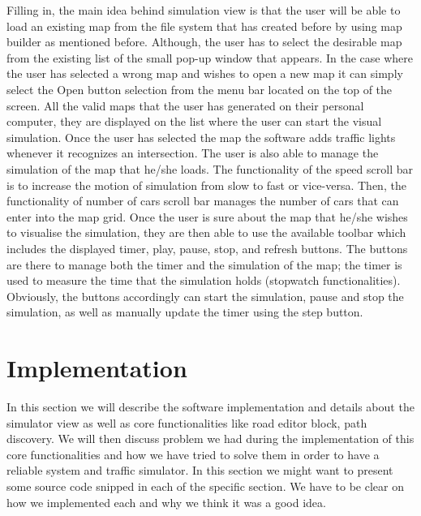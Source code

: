 \documentclass[oneside]{article}
\begin{document}
\noindent Filling in, the main idea behind simulation view is that the user will be able to load an existing map from the file system that has created before by using map builder as mentioned before. Although, the user has to select the desirable map from the existing list of the small pop-up window that appears. In the case where the user has selected a wrong map and wishes to open a new map it can simply select the Open button selection from the menu bar located on the top of the screen. All the valid maps that the user has generated on their personal computer, they are displayed on the list where the user can start the visual simulation. Once the user has selected the map the software adds traffic lights whenever it recognizes an intersection. The user is also able to manage the simulation of the map that he/she loads. The functionality of the speed scroll bar is to increase the motion of simulation from slow to fast or vice-versa. Then, the functionality of number of cars scroll bar manages the number of cars that can enter into the map grid. Once the user is sure about the map that he/she wishes to visualise the simulation, they are then able to use the available toolbar which includes the displayed timer, play, pause, stop, and refresh buttons. The buttons are there to manage both the timer and the simulation of the map; the timer is used to measure the time that the simulation holds (stopwatch functionalities). Obviously, the buttons accordingly can start the simulation, pause and stop the simulation, as well as manually update the timer using the step button.
\newpage

\section{Implementation}

\noindent In this section we will describe the software implementation and details about the simulator view as well as core functionalities like road editor block, path discovery. We will then discuss problem we had during the implementation of this core functionalities and how we have tried to solve them in order to have a reliable system and traffic simulator. In this section we might want to present some source code snipped in each of the specific section. We have to be clear on how we implemented each and why we think it was a good idea.
\newline
\end{document}

